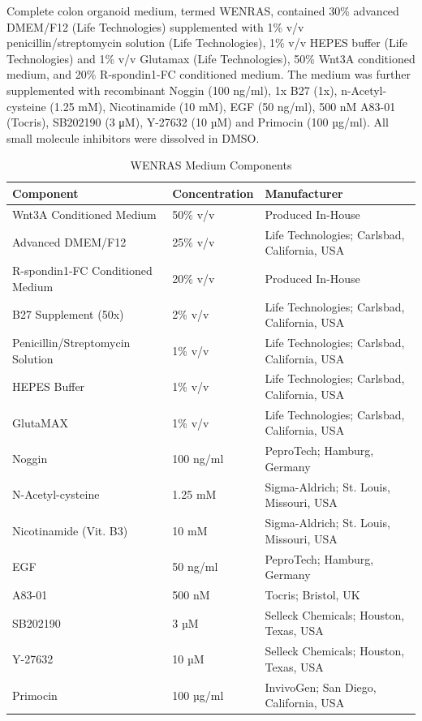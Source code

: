 \begin{flushleft}
Complete colon organoid medium, termed WENRAS, contained 30\% advanced DMEM/F12 (Life Technologies) supplemented with 1\% v/v penicillin/streptomycin solution (Life Technologies), 1\% v/v HEPES buffer (Life Technologies) and 1\% v/v Glutamax (Life Technologies), 50\% Wnt3A conditioned medium, and 20\% R-spondin1-FC conditioned medium. 
The medium was further supplemented with recombinant Noggin (100 ng/ml), 1x B27 (1x), n-Acetyl-cysteine (1.25 mM), Nicotinamide (10 mM), EGF (50 ng/ml), 500 nM A83-01 (Tocris), SB202190 (3 μM), Y-27632 (10 µM) and Primocin (100 µg/ml). All small molecule inhibitors were dissolved in DMSO. 


\begin{table}[htbp]
\caption{WENRAS Medium Components}
\label{tab:wenras_medium_components}
\begin{tabularx}{\textwidth}{Xll}
\toprule
\textbf{Component} & \textbf{Concentration} & \textbf{Manufacturer} \\
\midrule
Wnt3A Conditioned Medium & 50\% v/v & Produced In-House \\
Advanced DMEM/F12 & 25\% v/v & Life Technologies; Carlsbad, California, USA \\
R-spondin1-FC Conditioned Medium & 20\% v/v & Produced In-House \\
B27 Supplement (50x) & 2\% v/v & Life Technologies; Carlsbad, California, USA \\
Penicillin/Streptomycin Solution & 1\% v/v & Life Technologies; Carlsbad, California, USA \\
HEPES Buffer & 1\% v/v & Life Technologies; Carlsbad, California, USA \\
GlutaMAX & 1\% v/v & Life Technologies; Carlsbad, California, USA \\
Noggin & 100 ng/ml & PeproTech; Hamburg, Germany \\
N-Acetyl-cysteine & 1.25 mM & Sigma-Aldrich; St. Louis, Missouri, USA \\
Nicotinamide (Vit. B3) & 10 mM & Sigma-Aldrich; St. Louis, Missouri, USA \\
EGF & 50 ng/ml & PeproTech; Hamburg, Germany \\
A83-01 & 500 nM & Tocris; Bristol, UK \\
SB202190 & 3 µM & Selleck Chemicals; Houston, Texas, USA \\
Y-27632 & 10 µM & Selleck Chemicals; Houston, Texas, USA \\ 
Primocin & 100 µg/ml & InvivoGen; San Diego, California, USA \\
\bottomrule
\end{tabularx}
\end{table}


\end{flushleft}
